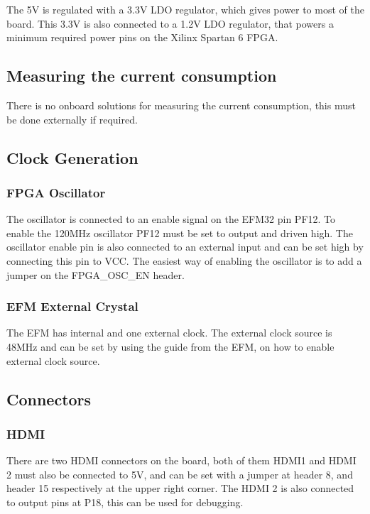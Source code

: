 The 5V is regulated with a 3.3V LDO regulator, which gives power to most of the board. This 3.3V is also connected to a 1.2V LDO regulator, that powers a minimum required power pins on the Xilinx Spartan 6 FPGA. 

\subsection{Measuring the current consumption}
There is no onboard solutions for measuring the current consumption, this must be done externally if required. 

\subsection{Clock Generation}
\subsubsection{FPGA Oscillator}The oscillator is connected to an enable signal on the EFM32 pin PF12. To enable the 120MHz oscillator PF12 must be set to output and driven high. The oscillator enable pin is also connected to an external input and can be set high by connecting this pin to VCC. The easiest way of enabling the oscillator is to add a jumper on the FPGA\_OSC\_EN header.
\newline
\subsubsection{EFM External Crystal}
The EFM has internal and one external clock. The external clock source is 48MHz and can be set by using the guide from the EFM, on how to enable external clock source. 
\subsection{Connectors}
\subsubsection{HDMI}
There are two HDMI connectors on the board, both of them HDMI1 and HDMI 2 must also be connected to 5V, and can be set with a jumper at header 8, and header 15 respectively at the upper right corner. The HDMI 2 is also connected to output pins at P18, this can be used for debugging.

